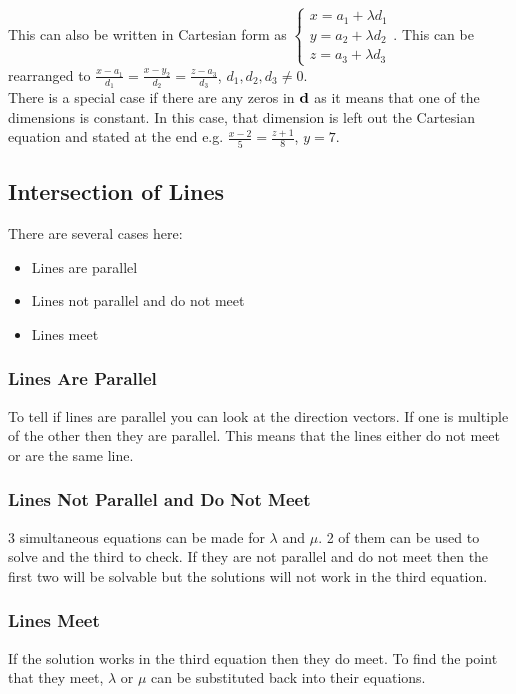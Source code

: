 \documentclass[a4paper,12pt]{article}
\begin{document}
This can also be written in Cartesian form as $\begin{cases} x = a_1 + \lambda d_1 \\ y = a_2 + \lambda d_2 \\ z = a_3 + \lambda d_3 \end{cases}$. This can be rearranged to $\frac{x-a_1}{d_1}=\frac{x-y_2}{d_2}=\frac{z-a_3}{d_3}$, $d_1, d_2, d_3 \neq 0$. \\

There is a special case if there are any zeros in $\bold{d}$ as it means that one of the dimensions is constant. In this case, that dimension is left out the Cartesian equation and stated at the end e.g. $\frac{x-2}{5}=\frac{z+1}{8}$, $y=7$.

\subsection*{Intersection of Lines}
There are several cases here:
\begin{itemize}
	\item Lines are parallel
	\item Lines not parallel and do not meet
	\item Lines meet
\end{itemize}
\subsubsection*{Lines Are Parallel}
To tell if lines are parallel you can look at the direction vectors. If one is multiple of the other then they are parallel. This means that the lines either do not meet or are the same line. 

\subsubsection*{Lines Not Parallel and Do Not Meet}
3 simultaneous equations can be made for $\lambda$ and $\mu$. 2 of them can be used to solve and the third to check. If they are not parallel and do not meet then the first two will be solvable but the solutions will not work in the third equation. 

\subsubsection*{Lines Meet}
If the solution works in the third equation then they do meet. To find the point that they meet, $\lambda$ or $\mu$ can be substituted back into their equations. 
\end{document}
